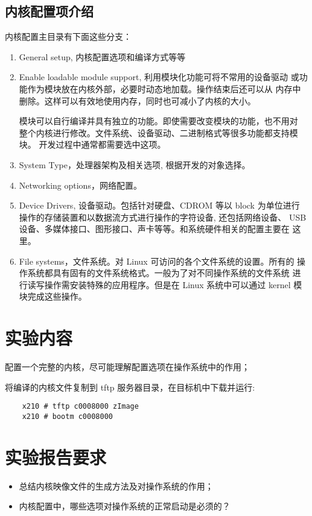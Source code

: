 \subsection{内核配置项介绍}
	内核配置主目录有下面这些分支：
\begin{enumerate}\itemsep=-3pt
  \item General setup, 内核配置选项和编译方式等等
  \item Enable loadable module support, 利用模块化功能可将不常用的设备驱动
		或功能作为模块放在内核外部，必要时动态地加载。操作结束后还可以从
		内存中删除。这样可以有效地使用内存，同时也可减小了内核的大小。

		模块可以自行编译并具有独立的功能。即使需要改变模块的功能，也不用对
		整个内核进行修改。文件系统、设备驱动、二进制格式等很多功能都支持模块。
		开发过程中通常都需要选中这项。
  \item System Type，处理器架构及相关选项, 根据开发的对象选择。
  \item Networking options，网络配置。
  \item Device Drivers, 设备驱动。包括针对硬盘、CDROM 等以 block 为单位进行
		操作的存储装置和以数据流方式进行操作的字符设备, 还包括网络设备、
		USB设备、多媒体接口、图形接口、声卡等等。和系统硬件相关的配置主要在
		这里。
  \item File systems，文件系统。对 Linux 可访问的各个文件系统的设置。所有的
		操作系统都具有固有的文件系统格式。一般为了对不同操作系统的文件系统
		进行读写操作需安装特殊的应用程序。但是在 Linux 系统中可以通过
		kernel 模块完成这些操作。
\end{enumerate}

\section{实验内容}
	配置一个完整的内核，尽可能理解配置选项在操作系统中的作用；

	将编译的内核文件复制到 tftp 服务器目录，在目标机中下载并运行:

\begin{boxedminipage}{.9\textwidth}
\begin{verbatim}
	x210 # tftp c0008000 zImage
	x210 # bootm c0008000
\end{verbatim}
\end{boxedminipage}


\section{实验报告要求}
\begin{itemize}\itemsep=-3pt
  \item 总结内核映像文件的生成方法及对操作系统的作用；
  \item 内核配置中，哪些选项对操作系统的正常启动是必须的？
\end{itemize}
